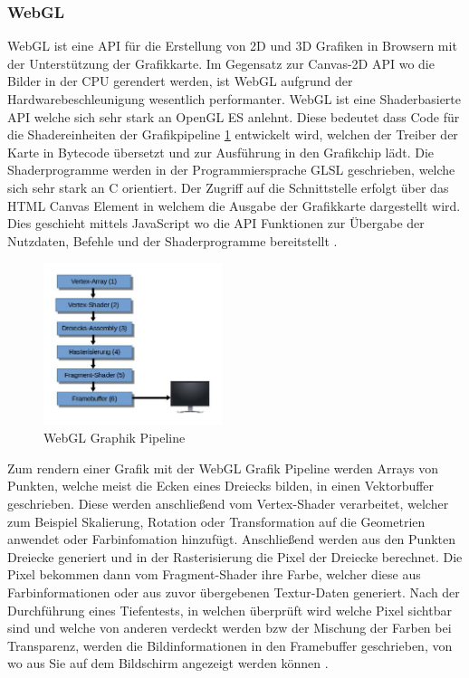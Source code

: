 \subsubsection{WebGL}
\label{sec:WebGL}
WebGL ist eine API für die Erstellung von 2D und 3D Grafiken in Browsern mit der Unterstützung der Grafikkarte.
Im Gegensatz zur Canvas-2D API wo die Bilder in der CPU gerendert werden, ist WebGL aufgrund der Hardwarebeschleunigung wesentlich performanter.
WebGL ist eine Shaderbasierte API welche sich sehr stark an OpenGL ES anlehnt.
Diese bedeutet dass Code für die Shadereinheiten der Grafikpipeline \ref{fig:webgl_graphics_pipeline} entwickelt wird,
welchen der Treiber der Karte in Bytecode übersetzt und zur Ausführung in den Grafikchip lädt.
Die Shaderprogramme werden in der Programmiersprache GLSL geschrieben, welche sich sehr stark an C orientiert.
Der Zugriff auf die Schnittstelle erfolgt über das HTML Canvas Element in welchem die Ausgabe der Grafikkarte dargestellt wird.
Dies geschieht mittels JavaScript wo die API Funktionen zur Übergabe der Nutzdaten, Befehle und der Shaderprogramme bereitstellt \cite{webgl-14}.
\begin{figure}[t]
	\centering
	\includegraphics[width=5.2cm]{img/graphics_pipeline.jpg}
	\caption{WebGL Graphik Pipeline}
	\label{fig:webgl_graphics_pipeline}
\end{figure}

Zum rendern einer Grafik mit der WebGL Grafik Pipeline werden Arrays von Punkten, welche meist die Ecken eines Dreiecks bilden, in einen Vektorbuffer geschrieben.
Diese werden anschließend vom Vertex-Shader verarbeitet, welcher zum Beispiel Skalierung, Rotation oder Transformation auf die Geometrien anwendet oder Farbinfomation hinzufügt.
Anschließend werden aus den Punkten Dreiecke generiert und in der Rasterisierung die Pixel der Dreiecke berechnet.
Die Pixel bekommen dann vom Fragment-Shader ihre Farbe, welcher diese aus Farbinformationen oder aus zuvor übergebenen Textur-Daten generiert.
Nach der Durchführung eines Tiefentests, 
in welchen überprüft wird welche Pixel sichtbar sind und welche von anderen verdeckt werden bzw der Mischung der Farben bei Transparenz, 
werden die Bildinformationen in den Framebuffer geschrieben,
von wo aus Sie auf dem Bildschirm angezeigt werden können \cite{webgl-introduction}.


